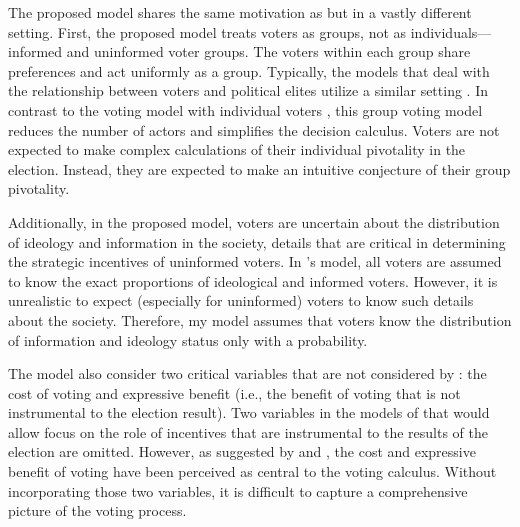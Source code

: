 \documentclass[doc,natbib,12pt]{apa6}
\begin{document}
	\par The proposed model shares the same motivation as \cite{Feddersen1996thsw, Feddersen1999abin} but in a vastly different setting. First, the proposed model treats voters as groups, not as individuals---informed and uninformed voter groups. The voters within each group share preferences and act uniformly as a group. Typically, the models that deal with the relationship between voters and political elites utilize a similar setting \citep[e.g.,][]{Little2015pran}. In contrast to the voting model with individual voters \citep[i.e.,][]{Feddersen1996thsw, Feddersen1999abin}, this group voting model reduces the number of actors and simplifies the decision calculus. Voters are not expected to make complex calculations of their individual pivotality in the election. Instead, they are expected to make an intuitive conjecture of their group pivotality.
	
	\par Additionally, in the proposed model, voters are uncertain about the distribution of ideology and information in the society, details that are critical in determining the strategic incentives of uninformed voters. In \citeauthor{Feddersen1996thsw}'s model, all voters are assumed to know the exact proportions of ideological and informed voters. However, it is unrealistic to expect (especially for uninformed) voters to know such details about the society. Therefore, my model assumes that voters know the distribution of information and ideology status only with a probability. 
	
	\par The model also consider two critical variables that are not considered by \cite{Feddersen1996thsw, Feddersen1999abin}: the cost of voting and expressive benefit (i.e., the benefit of voting that is not instrumental to the election result). Two variables in the models of \cite{Feddersen1996thsw, Feddersen1999abin} that would allow focus on the role of incentives that are instrumental to the results of the election are omitted. However, as suggested by \cite{Downs1957anec} and \cite{Riker1968thof}, the cost and expressive benefit of voting have been perceived as central to the voting calculus. Without incorporating those two variables, it is difficult to capture a comprehensive picture of the voting process. 
	
\end{document}
